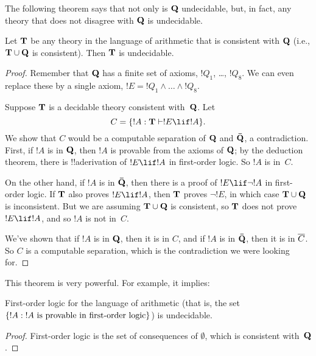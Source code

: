 \documentclass[../../../include/open-logic-section]{subfiles}
\begin{document}


The following theorem says that not only is $\mathbf{Q}$ undecidable, but, in
fact, any theory that does not disagree with $\mathbf{Q}$ is undecidable.

\begin{thm}
Let $\mathbf{T}$ be any theory in the language of arithmetic that is
consistent with $\mathbf{Q}$ (i.e., $\mathbf{T} \cup \mathbf{Q}$ is
consistent). Then $\mathbf{T}$ is undecidable.
\end{thm}

\begin{proof}
Remember that $\mathbf{Q}$ has a finite set of axioms, $!Q_1$, \dots,
$!Q_8$. We can even replace these by a single axiom, $!E = !Q_1 \land
\dots \land !Q_8$.

Suppose $\mathbf{T}$ is a decidable theory consistent with~$\mathbf{Q}$. Let
\[
C = \Setabs{!A}{\Th{T} \Proves !E \lif !A}.
\]
We show that $C$ would be a computable separation of $\mathbf{Q}$ and
$\mathbf{\bar Q}$, a contradiction. First, if $!A$ is in $\mathbf{Q}$, then
$!A$ is provable from the axioms of $\mathbf{Q}$; by the deduction
theorem, there is !!a{derivation} of $!E \lif !A$ in first-order logic. So
$!A$ is in~$C$.

On the other hand, if $!A$ is in $\mathbf{\bar Q}$, then there is a proof
of $!E \lif \lnot !A$ in first-order logic. If $\mathbf{T}$ also proves
$!E \lif !A$, then $\mathbf{T}$ proves $\lnot !E$, in which case $\mathbf{T}
\cup \mathbf{Q}$ is inconsistent. But we are assuming $\mathbf{T} \cup \mathbf{Q}$
is consistent, so $\mathbf{T}$ does not prove $!E \lif !A$, and so $!A$
is not in~$C$.

We've shown that if $!A$ is in $\mathbf{Q}$, then it is in $C$, and if
$!A$ is in $\mathbf{\bar Q}$, then it is in $\overline{C}$. So $C$ is a
computable separation, which is the contradiction we were looking for.
\end{proof}

This theorem is very powerful. For example, it implies:

\begin{cor}
  First-order logic for the language of arithmetic (that is, the set
  $\{ !A : \text{$!A$ is provable in first-order logic} \}$) is
  undecidable.
\end{cor}

\begin{proof}
First-order logic is the set of consequences of $\emptyset$,
which is consistent with~$\mathbf{Q}$.
\end{proof}
\end{document}

